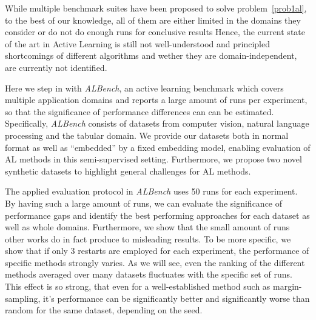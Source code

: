 \documentclass[]{article}
\begin{document}
While multiple benchmark suites have been proposed to solve
problem~\ref{prob1al}, to the best of
our knowledge, all of them are either limited in the domains they consider or do
not do enough runs for conclusive results 
Hence, the current
state of the art in Active Learning is still not well-understood and principled
shortcomings of different algorithms and wether they are 
domain-independent, are currently not identified.

Here we step in with \emph{ALBench}, an active learning benchmark which covers
multiple application domains and reports a large amount of runs per
experiment, so that the significance of performance differences can can be
estimated. Specifically, \emph{ALBench} consists of datasets from
computer vision, natural language processing and the tabular domain. We provide
our datasets both in normal format %
as well as ``embedded'' by a fixed embedding model, enabling evaluation of AL methods in
this semi-supervised setting.
Furthermore, we propose two novel synthetic datasets to highlight general
challenges for AL methods.

The applied evaluation protocol in \emph{ALBench} uses 50 runs for
each experiment. By having such a large amount of runs, we can evaluate the
significance of performance gaps and identify the best performing
approaches for each dataset as well as whole domains. 
Furthermore, we show that the small amount of runs other works do in fact 
produce to misleading results. 
To be more specific, we show that if only 3 restarts are employed for each experiment, 
the performance of specific methods strongly varies. As we will see, even the ranking of
the different methods averaged over many datasets fluctuates with the specific set of runs. 
This effect is so strong, that even for a well-established method such
as margin-sampling, it's performance can be significantly better and significantly
worse than random for the same dataset, depending on the seed. 
\end{document}
